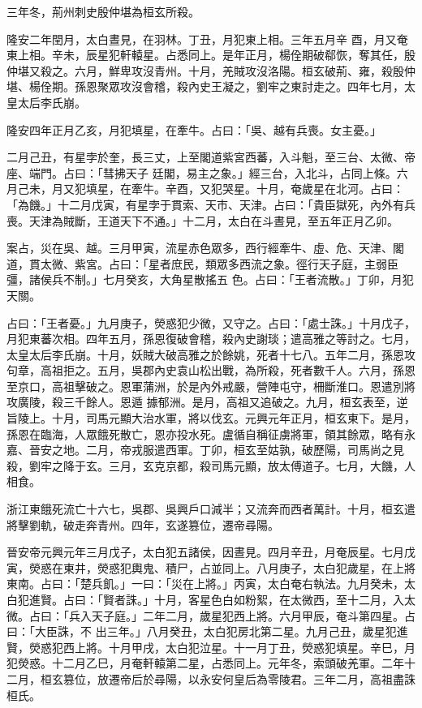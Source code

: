 \begin{pinyinscope}
 三年冬，荊州刺史殷仲堪為桓玄所殺。



 隆安二年閏月，太白晝見，在羽林。丁丑，月犯東上相。三年五月辛
 酉，月又奄東上相。辛未，辰星犯軒轅星。占悉同上。是年正月，楊佺期破郗恢，奪其任，殷仲堪又殺之。六月，鮮卑攻沒青州。十月，羌賊攻沒洛陽。桓玄破荊、雍，殺殷仲堪、楊佺期。孫恩聚眾攻沒會稽，殺內史王凝之，劉牢之東討走之。四年七月，太皇太后李氏崩。



 隆安四年正月乙亥，月犯填星，在牽牛。占曰：「吳、越有兵喪。女主憂。」



 二月己丑，有星孛於奎，長三丈，上至閣道紫宮西蕃，入斗魁，至三台、太微、帝座、端門。占曰：「彗拂天子
 廷閣，易主之象。」經三台，入北斗，占同上條。六月己未，月又犯填星，在牽牛。辛酉，又犯哭星。十月，奄歲星在北河。占曰：「為饑。」十二月戊寅，有星孛于貫索、天市、天津。占曰：「貴臣獄死，內外有兵喪。天津為賊斷，王道天下不通。」十二月，太白在斗晝見，至五年正月乙卯。



 案占，災在吳、越。三月甲寅，流星赤色眾多，西行經牽牛、虛、危、天津、閣道，貫太微、紫宮。占曰：「星者庶民，類眾多西流之象。徑行天子庭，主弱臣彊，諸侯兵不制。」七月癸亥，大角星散搖五
 色。占曰：「王者流散。」丁卯，月犯天關。



 占曰：「王者憂。」九月庚子，熒惑犯少微，又守之。占曰：「處士誅。」十月戊子，月犯東蕃次相。四年五月，孫恩復破會稽，殺內史謝琰；遣高雅之等討之。七月，太皇太后李氏崩。十月，妖賊大破高雅之於餘姚，死者十七八。五年二月，孫恩攻句章，高祖拒之。五月，吳郡內史袁山松出戰，為所殺，死者數千人。六月，孫恩至京口，高祖擊破之。恩軍蒲洲，於是內外戒嚴，營陣屯守，柵斷淮口。恩遣別將攻廣陵，殺三千餘人。恩遁
 據郁洲。是月，高祖又追破之。九月，桓玄表至，逆旨陵上。十月，司馬元顯大治水軍，將以伐玄。元興元年正月，桓玄東下。是月，孫恩在臨海，人眾餓死散亡，恩亦投水死。盧循自稱征虜將軍，領其餘眾，略有永嘉、晉安之地。二月，帝戎服遣西軍。丁卯，桓玄至姑孰，破歷陽，司馬尚之見殺，劉牢之降于玄。三月，玄克京都，殺司馬元顯，放太傅道子。七月，大饑，人相食。



 浙江東餓死流亡十六七，吳郡、吳興戶口減半；又流奔而西者萬計。十月，桓玄遣
 將擊劉軌，破走奔青州。四年，玄遂篡位，遷帝尋陽。



 晉安帝元興元年三月戊子，太白犯五諸侯，因晝見。四月辛丑，月奄辰星。七月戊寅，熒惑在東井，熒惑犯輿鬼、積尸，占並同上。八月庚子，太白犯歲星，在上將東南。占曰：「楚兵飢。」一曰：「災在上將。」丙寅，太白奄右執法。九月癸未，太白犯進賢。占曰：「賢者誅。」十月，客星色白如粉絮，在太微西，至十二月，入太微。占曰：「兵入天子庭。」二年二月，歲星犯西上將。六月甲辰，奄斗第四星。占曰：「大臣誅，不
 出三年。」八月癸丑，太白犯房北第二星。九月己丑，歲星犯進賢，熒惑犯西上將。十月甲戌，太白犯泣星。十一月丁丑，熒惑犯填星。辛巳，月犯熒惑。十二月乙巳，月奄軒轅第二星，占悉同上。元年冬，索頭破羌軍。二年十二月，桓玄篡位，放遷帝后於尋陽，以永安何皇后為零陵君。三年二月，高祖盡誅桓氏。




\end{pinyinscope}
